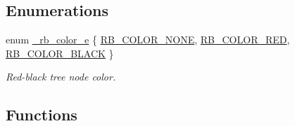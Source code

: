 \subsection*{Enumerations}
\begin{CompactItemize}
\item 
enum \hyperlink{group__dbprim__rbtree_a38}{\_\-rb\_\-color\_\-e} \{ \hyperlink{group__dbprim__rbtree_a38a137}{RB\_\-COLOR\_\-NONE}, 
\hyperlink{group__dbprim__rbtree_a38a138}{RB\_\-COLOR\_\-RED}, 
\hyperlink{group__dbprim__rbtree_a38a139}{RB\_\-COLOR\_\-BLACK}
 \}
\begin{CompactList}\small\item\em Red-black tree node color.\item\end{CompactList}\end{CompactItemize}
\subsection*{Functions}
